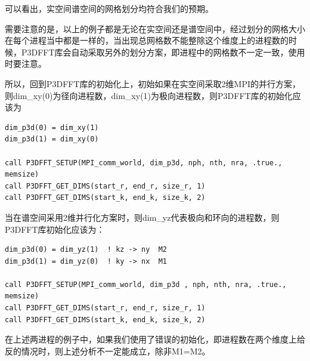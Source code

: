 \documentclass[11pt,a4paper]{article}
\begin{document}
\begin{figure}[H]
	\centering
	\caption{}
\end{figure}
可以看出，实空间谱空间的网格划分均符合我们的预期。

需要注意的是，以上的例子都是无论在实空间还是谱空间中，经过划分的网格大小在每个进程当中都是一样的，当出现总网格数不能整除这个维度上的进程数的时候，P3DFFT库会自动采取另外的划分方案，即进程中的网格数不一定一致，使用时要注意。

所以，回到P3DFFT库的初始化上，初始如果在实空间采取2维MPI的并行方案，则dim_xy(0)为径向进程数，dim_xy(1)为极向进程数，则P3DFFT库的初始化应该为
\begin{lstlisting}
dim_p3d(0) = dim_xy(1)
dim_p3d(1) = dim_xy(0)

call P3DFFT_SETUP(MPI_comm_world, dim_p3d, nph, nth, nra, .true., memsize)
call P3DFFT_GET_DIMS(start_r, end_r, size_r, 1)
call P3DFFT_GET_DIMS(start_k, end_k, size_k, 2)
\end{lstlisting}
当在谱空间采用2维并行化方案时，则dim_yz代表极向和环向的进程数，则P3DFFT库初始化应该为：
\begin{lstlisting}
dim_p3d(0) = dim_yz(1)	! kz -> ny	M2
dim_p3d(1) = dim_yz(0)	! ky -> nx	M1

call P3DFFT_SETUP(MPI_comm_world, dim_p3d , nph, nth, nra, .true., memsize)
call P3DFFT_GET_DIMS(start_r, end_r, size_r, 1)
call P3DFFT_GET_DIMS(start_k, end_k, size_k, 2)
\end{lstlisting}


在上述两进程的例子中，如果我们使用了错误的初始化，即进程数在两个维度上给反的情况时，则上述分析不一定能成立，除非M1=M2。
\end{document}
